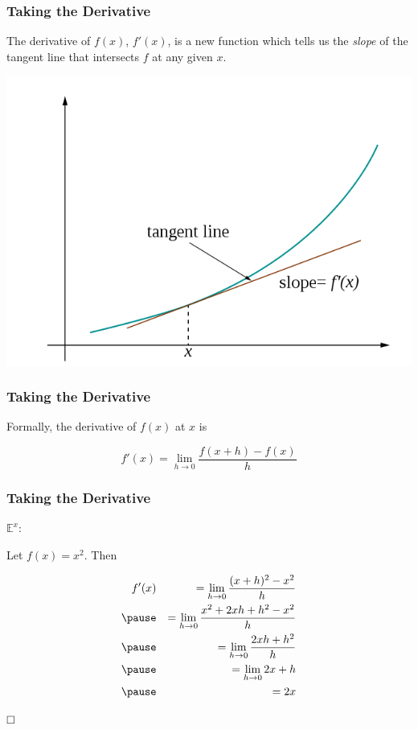 \documentclass{beamer}
\def\qed{ \hspace*{\fill} \Box}
\begin{document}
\begin{frame}

  \frametitle{Taking the Derivative}

  The derivative of $f(x)$, $f'(x)$, is a new function which tells us the \textit{slope} of the tangent line that intersects $f$ at any given $x$.

  \includegraphics[scale=.4]{tangent.png}

\end{frame}

\begin{frame}

  \frametitle{Taking the Derivative}

  Formally, the derivative of $f(x)$ at $x$ is

  \[ f'(x) = \lim_{h \to 0} \frac{f(x+h) - f(x)}{h} \]

\end{frame}

\begin{frame}

  \frametitle{Taking the Derivative}

  $\mathbb{E}^x$:

  Let $f(x) = x^2$. \pause Then

  \begin{eqnarray*}
    f'(x) &&  = \lim_{h \to 0} \frac{(x+h)^2 - x^2}{h} \\ \pause
    && = \lim_{h \to 0} \frac{x^2 + 2xh + h^2 - x^2}{h} \\ \pause
    && = \lim_{h \to 0} \frac{2xh + h^2}{h} \\ \pause
    && = \lim_{h \to 0} 2x + h \\ \pause
    && = 2x \\
  \end{eqnarray*}

  $\qed$

\end{frame}
\end{document}
